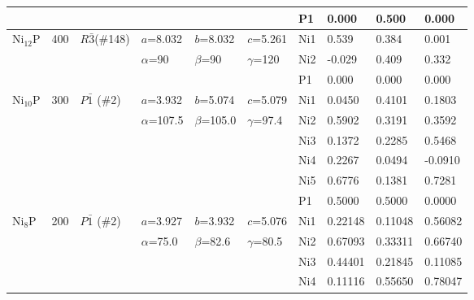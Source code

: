 \documentclass[twoside,twocolumn,9pt]{article}
\begin{document}
\begin{table}[t]
\begin{tabular*}{\textwidth}{@{\extracolsep{\fill}}llllllllll}
               &     &               &                  &                 &                  & P1  & 0.000 & 0.500 & 0.000 \\
\midrule
    Ni$_{12}$P & 400 & $R\bar3$(\#148)    & $a$=8.032    & $b$=8.032   & $c$=5.261    & Ni1 & 0.539  & 0.384 & 0.001 \\
               &     &               & $\alpha$=90   & $\beta$=90 & $\gamma$=120       & Ni2 & -0.029 & 0.409 & 0.332 \\
               &     &               &                  &                 &                  & P1  & 0.000  & 0.000 & 0.000 \\
\midrule
    Ni$_{10}$P & 300 & $P\bar{1}$ (\#2)     & $a$=3.932    & $b$=5.074   & $c$=5.079    & Ni1 & 0.0450 & 0.4101 & 0.1803 \\
               &     &               & $\alpha$=107.5 & $\beta$=105.0 & $\gamma$=97.4  & Ni2 & 0.5902 & 0.3191 & 0.3592 \\
               &     &               &                  &                 &                  & Ni3 & 0.1372 & 0.2285 & 0.5468 \\
               &     &               &                  &                 &                  & Ni4 & 0.2267 & 0.0494 & -0.0910\\
               &     &               &                  &                 &                  & Ni5 & 0.6776 & 0.1381 & 0.7281 \\
               &     &               &                  &                 &                  & P1  & 0.5000 & 0.5000 & 0.0000 \\
\midrule
    Ni$_{8}$P  & 200 & $P\bar{1}$ (\#2)     & $a$=3.927    & $b$=3.932   & $c$=5.076    & Ni1 & 0.22148 & 0.11048 & 0.56082 \\
               &     &               & $\alpha$=75.0 & $\beta$=82.6 & $\gamma$=80.5     & Ni2 & 0.67093 & 0.33311 & 0.66740 \\
               &     &               &                  &                 &                  & Ni3 & 0.44401 & 0.21845 & 0.11085 \\
               &     &               &                  &                 &                  & Ni4 & 0.11116 & 0.55650 & 0.78047 \\

\end{tabular*}
\end{table}
\end{document}
